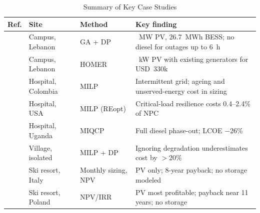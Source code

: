 \begin{table}[!t]
\centering
\caption{Summary of Key Case Studies}
\label{tab:lit}
\footnotesize
\setlength{\tabcolsep}{3pt}
\begin{tabular}{@{}l >{\raggedright\arraybackslash}p{1.35cm} >{\raggedright\arraybackslash}p{1.45cm} >{\raggedright\arraybackslash}p{3.6cm}@{}}
\toprule
Ref. & Site & Method & Key finding \\
\midrule
\cite{chedid2020}   & Campus, Lebanon      & GA + DP              & 2.4~MW PV, 26.7~MWh BESS; no diesel for outages up to 6~h \\
\cite{tarnini2023}  & Campus, Lebanon      & HOMER                & 500~kW PV with existing generators for USD~330k \\
\cite{leon2023}     & Hospital, Colombia   & MILP                 & Intermittent grid; ageing and unserved-energy cost in sizing \\
\cite{eissa2026}    & Hospital, USA        & MILP (REopt)         & Critical-load resilience costs 0.4--2.4\% of NPC \\
\cite{felice2023}   & Hospital, Uganda     & MIQCP                & Full diesel phase-out; LCOE $-$26\% \\
\cite{seger2023}    & Village, isolated    & MILP + DP            & Ignoring degradation underestimates cost by $>$20\% \\
\cite{scuderi2025}  & Ski resort, Italy    & Monthly sizing, NPV  & PV only; 8-year payback; no storage modeled \\
\cite{lewicki2024}  & Ski resort, Poland   & NPV/IRR              & PV most profitable; payback near 11 years; no storage \\
\bottomrule
\end{tabular}
\end{table}
